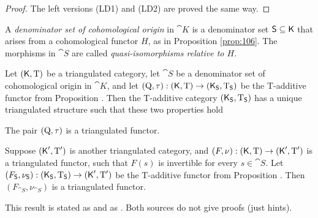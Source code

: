 \begin{proof}
The left versions (LD1) and (LD2) are proved the same way. 
\end{proof}

\begin{dfn} \label{dfn:1495}
A {\em denominator set of cohomological origin}
in $\cat{K}$ is a denominator set $\operatorname{\mathsf{S}} \subseteq \operatorname{\mathsf{K}}$ 
that arises from a cohomological functor $H$, as in Proposition \ref{prop:106}.
The morphisms in $\cat{S}$ are called {\em quasi-isomorphisms relative to $H$}.
\end{dfn}

\begin{thm} \label{thm:105}
Let $(\operatorname{\mathsf{K}}, \operatorname{T})$ be a triangulated category, let $\cat{S}$ be a 
denominator set of cohomological origin in $\cat{K}$, 
and let 
$(\operatorname{Q}, \tau) : (\operatorname{\mathsf{K}}, \operatorname{T}) \to
(\operatorname{\mathsf{K}}_{\operatorname{\mathsf{S}}}, \operatorname{T}_{\operatorname{\mathsf{S}}})$
be the T-additive functor from Proposition \tup{\ref{prop:1840}}. Then the 
T-additive category 
$(\operatorname{\mathsf{K}}_{\operatorname{\mathsf{S}}}, \operatorname{T}_{\operatorname{\mathsf{S}}})$
has a unique triangulated structure 
such that these two properties 
hold\tup{:}

\begin{enumerate}
 The pair $(\operatorname{Q}, \tau)$ is a triangulated functor. 

 Suppose 
$(\operatorname{\mathsf{K}}', \operatorname{T}')$ 
is another triangulated category, and 
$(F, \nu) : (\operatorname{\mathsf{K}}, \operatorname{T}) \to (\operatorname{\mathsf{K}}', \operatorname{T}')$
is a triangulated functor, such that
$F(s)$ is invertible for every $s \in \cat{S}$. Let 
$(F_{\operatorname{\mathsf{S}}}, \nu_{\operatorname{\mathsf{S}}}) : (\operatorname{\mathsf{K}}_{\operatorname{\mathsf{S}}}, \operatorname{T}_{\operatorname{\mathsf{S}}}) \to 
(\operatorname{\mathsf{K}}', \operatorname{T}')$
be the T-additive functor from Proposition \tup{\ref{prop:1841}}.
Then $(F_{\cat{S}}, \nu_{\cat{S}})$ is a triangulated functor. 
\end{enumerate}
\end{thm}

This result is stated as \cite[Proposition I.3.2]{RD} and 
as \cite[Proposition 1.6.9]{KaSc1}. Both sources do not give proofs (just 
hints). 

